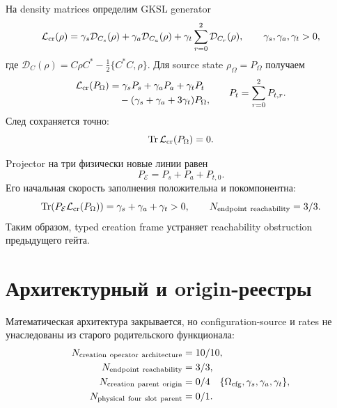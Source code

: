 На density matrices определим GKSL generator
\cite{v9-creation-lindblad,v9-creation-covariant-qms}
\begin{equation}
 \mathcal L_{\rm cr}(\rho)=
 \gamma_s\mathcal D_{C_s}(\rho)+\gamma_a\mathcal D_{C_a}(\rho)
 +\gamma_t\sum_{r=0}^{2}\mathcal D_{C_r}(\rho),
 \qquad \gamma_s,\gamma_a,\gamma_t>0,
 \label{eq:v9-creation-gksl}
\end{equation}
где
$\mathcal D_C(\rho)=C\rho C^*-\frac12\{C^*C,\rho\}$.
Для source state $\rho_\Omega=P_\Omega$ получаем
\begin{equation}
 \begin{aligned}
 \mathcal L_{\rm cr}(P_\Omega)
 &=\gamma_sP_s+\gamma_aP_a+\gamma_tP_t\\
 &\quad-(\gamma_s+\gamma_a+3\gamma_t)P_\Omega,
 \end{aligned}
 \qquad P_t=\sum_{r=0}^{2}P_{t,r}.
 \label{eq:v9-creation-initial-derivative}
\end{equation}
След сохраняется точно:
\begin{equation}
 \operatorname{Tr}\mathcal L_{\rm cr}(P_\Omega)=0.
 \label{eq:v9-creation-trace-preservation}
\end{equation}

Projector на три физически новые линии равен
\begin{equation}
 P_{\mathcal E}=P_s+P_a+P_{t,0}.
 \label{eq:v9-creation-new-projector}
\end{equation}
Его начальная скорость заполнения положительна и покомпонентна:
\begin{equation}
 \operatorname{Tr}\!\left(P_{\mathcal E}\mathcal L_{\rm cr}(P_\Omega)\right)
 =\gamma_s+\gamma_a+\gamma_t>0,
 \qquad N_{\rm endpoint\ reachability}=3/3.
 \label{eq:v9-creation-reachability}
\end{equation}
Таким образом, typed creation frame устраняет reachability obstruction
предыдущего гейта.

\section{Архитектурный и origin-реестры}

Математическая архитектура закрывается, но configuration-source и rates не
унаследованы из старого родительского функционала:
\begin{equation}
 \begin{aligned}
 N_{\rm creation\ operator\ architecture}&=10/10,\\
 N_{\rm endpoint\ reachability}&=3/3,\\
 N_{\rm creation\ parent\ origin}&=0/4
 \quad\{\Omega_{\rm cfg},\gamma_s,\gamma_a,\gamma_t\},\\
 N_{\rm physical\ four\ slot\ parent}&=0/1.
 \end{aligned}
 \label{eq:v9-creation-final-ledgers}
\end{equation}

